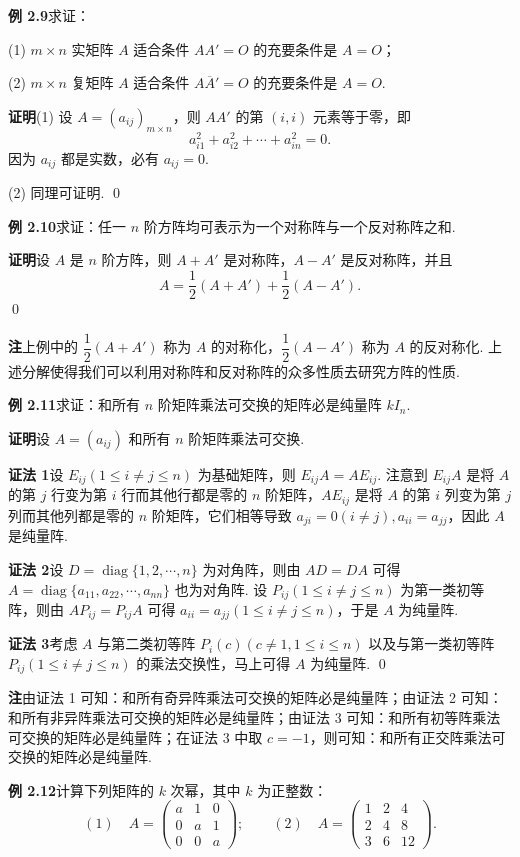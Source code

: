 \documentclass[UTF8,12pt,a4paper,fontset=fandol]{ctexart}
\begin{document}
\noindent\textbf{例 2.9}\quad 求证：

(1) $m\times n$ 实矩阵 $A$ 适合条件 $AA'=O$ 的充要条件是 $A=O$；

(2) $m\times n$ 复矩阵 $A$ 适合条件 $A\overline A'=O$ 的充要条件是 $A=O$.

\noindent\textbf{证明}\quad (1) 设 $A=(a_{ij})_{m\times n}$，则 $AA'$ 的第 $(i,i)$ 元素等于零，即
\[
a_{i1}^2+a_{i2}^2+\cdots+a_{in}^2=0.
\]
因为 $a_{ij}$ 都是实数，必有 $a_{ij}=0$.

(2) 同理可证明. \qed

\noindent\textbf{例 2.10}\quad 求证：任一 $n$ 阶方阵均可表示为一个对称阵与一个反对称阵之和.

\noindent\textbf{证明}\quad 设 $A$ 是 $n$ 阶方阵，则 $A+A'$ 是对称阵，$A-A'$ 是反对称阵，并且
\[
A=\frac12(A+A')+\frac12(A-A').
\]
\qed

\noindent\textbf{注}\quad 上例中的 $\dfrac12(A+A')$ 称为 $A$ 的对称化，$\dfrac12(A-A')$ 称为 $A$ 的反对称化. 上述分解使得我们可以利用对称阵和反对称阵的众多性质去研究方阵的性质.

\noindent\textbf{例 2.11}\quad 求证：和所有 $n$ 阶矩阵乘法可交换的矩阵必是纯量阵 $kI_n$.

\noindent\textbf{证明}\quad 设 $A=(a_{ij})$ 和所有 $n$ 阶矩阵乘法可交换.

\noindent\textbf{证法 1}\quad 设 $E_{ij}(1\le i\ne j\le n)$ 为基础矩阵，则 $E_{ij}A=AE_{ij}$. 注意到 $E_{ij}A$ 是将 $A$ 的第 $j$ 行变为第 $i$ 行而其他行都是零的 $n$ 阶矩阵，$AE_{ij}$ 是将 $A$ 的第 $i$ 列变为第 $j$ 列而其他列都是零的 $n$ 阶矩阵，它们相等导致 $a_{ji}=0(i\ne j),a_{ii}=a_{jj}$，因此 $A$ 是纯量阵.

\noindent\textbf{证法 2}\quad 设 $D=\operatorname{diag}\{1,2,\cdots,n\}$ 为对角阵，则由 $AD=DA$ 可得 $A=\operatorname{diag}\{a_{11},a_{22},\cdots,a_{nn}\}$ 也为对角阵. 设 $P_{ij}(1\le i\ne j\le n)$ 为第一类初等阵，则由 $AP_{ij}=P_{ij}A$ 可得 $a_{ii}=a_{jj}(1\le i\ne j\le n)$，于是 $A$ 为纯量阵.

\noindent\textbf{证法 3}\quad 考虑 $A$ 与第二类初等阵 $P_i(c)(c\ne1,1\le i\le n)$ 以及与第一类初等阵 $P_{ij}(1\le i\ne j\le n)$ 的乘法交换性，马上可得 $A$ 为纯量阵. \qed

\noindent\textbf{注}\quad 由证法 1 可知：和所有奇异阵乘法可交换的矩阵必是纯量阵；由证法 2 可知：和所有非异阵乘法可交换的矩阵必是纯量阵；由证法 3 可知：和所有初等阵乘法可交换的矩阵必是纯量阵；在证法 3 中取 $c=-1$，则可知：和所有正交阵乘法可交换的矩阵必是纯量阵.

\noindent\textbf{例 2.12}\quad 计算下列矩阵的 $k$ 次幂，其中 $k$ 为正整数：
\[
(1)\quad
A=\left(
\begin{array}{ccc}
a & 1 & 0\\
0 & a & 1\\
0 & 0 & a
\end{array}
\right);
\qquad
(2)\quad
A=\left(
\begin{array}{ccc}
1 & 2 & 4\\
2 & 4 & 8\\
3 & 6 & 12
\end{array}
\right).
\]
\end{document}

